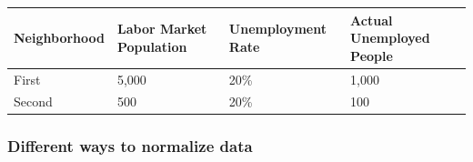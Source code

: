 \documentclass[
  english,
]{book}
\begin{document}
\begin{longtable}[]{@{}llll@{}}
\toprule
\begin{minipage}[b]{0.22\columnwidth}\raggedright
Neighborhood\strut
\end{minipage} & \begin{minipage}[b]{0.22\columnwidth}\raggedright
Labor Market Population\strut
\end{minipage} & \begin{minipage}[b]{0.22\columnwidth}\raggedright
Unemployment Rate\strut
\end{minipage} & \begin{minipage}[b]{0.22\columnwidth}\raggedright
Actual Unemployed People\strut
\end{minipage}\tabularnewline
\midrule
\endhead
\begin{minipage}[t]{0.22\columnwidth}\raggedright
First\strut
\end{minipage} & \begin{minipage}[t]{0.22\columnwidth}\raggedright
5,000\strut
\end{minipage} & \begin{minipage}[t]{0.22\columnwidth}\raggedright
20\%\strut
\end{minipage} & \begin{minipage}[t]{0.22\columnwidth}\raggedright
1,000\strut
\end{minipage}\tabularnewline
\begin{minipage}[t]{0.22\columnwidth}\raggedright
Second\strut
\end{minipage} & \begin{minipage}[t]{0.22\columnwidth}\raggedright
500\strut
\end{minipage} & \begin{minipage}[t]{0.22\columnwidth}\raggedright
20\%\strut
\end{minipage} & \begin{minipage}[t]{0.22\columnwidth}\raggedright
100\strut
\end{minipage}\tabularnewline
\bottomrule
\end{longtable}

\hypertarget{different-ways-to-normalize-data}{%
\subsubsection*{Different ways to normalize data}\label{different-ways-to-normalize-data}}
\end{document}
